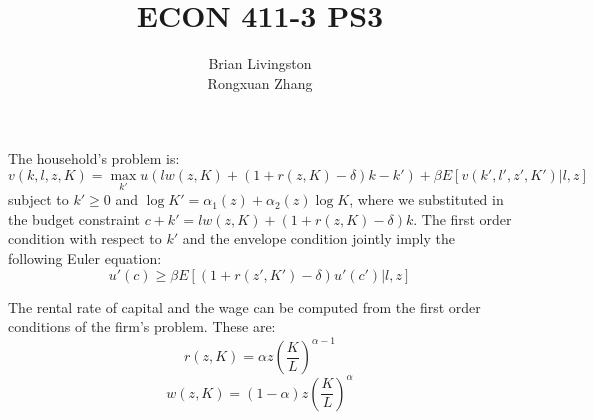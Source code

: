 \documentclass{article}
\title{ECON 411-3 PS3}
\author{Brian Livingston \\ Rongxuan Zhang}
\date{}
\begin{document}
\maketitle

The household's problem is:
$$
v(k,l,z,K) = \max_{k'} u(lw(z,K)+(1+r(z,K)-\delta)k-k')+\beta E[v(k',l',z',K')|l,z]
$$
subject to $k'\geq 0$ and $\log K'=\alpha_1(z)+\alpha_2(z) \log K$, where we substituted in the budget constraint $c+k'=lw(z,K)+(1+r(z,K)-\delta)k$.
The first order condition with respect to $k'$ and the envelope condition jointly imply the following Euler equation:
$$
u'(c) \geq \beta E[(1+r(z',K')-\delta)u'(c')|l,z]
$$

The rental rate of capital and the wage can be computed from the first order conditions of the firm's problem. These are:
$$
r(z,K) = \alpha z\left(\frac{K}{L}\right)^{\alpha-1}
$$
$$
w(z,K) = (1-\alpha)z\left(\frac{K}{L}\right)^{\alpha}
$$
\end{document}
